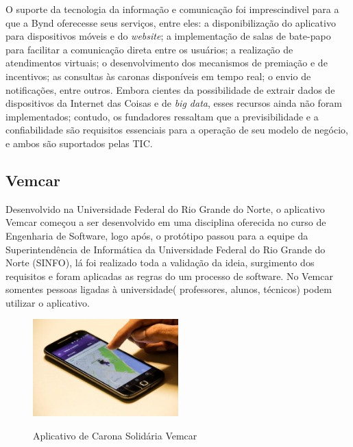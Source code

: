 
O suporte da tecnologia da informação e comunicação foi imprescindivel para a que a Bynd oferecesse seus serviços, entre eles: a disponibilização do aplicativo para dispositivos móveis e do \textit{website}; a implementação de salas de bate-papo para facilitar a comunicação direta entre os usuários; a realização de atendimentos virtuais; o desenvolvimento dos mecanismos de premiação e de incentivos; as consultas às caronas disponíveis em tempo real; o envio de notificações, entre outros. Embora cientes da possibilidade de extrair dados de dispositivos da Internet das Coisas e de \textit{big data}, esses recursos ainda não foram implementados; contudo, os fundadores ressaltam que a previsibilidade e a confiabilidade são requisitos essenciais para a operação de seu modelo de negócio, e ambos são suportados pelas TIC. 


\subsection{Vemcar}

Desenvolvido na Universidade Federal do Rio Grande do Norte, o aplicativo Vemcar começou a ser desenvolvido em uma disciplina oferecida no curso de Engenharia de Software, logo após, o protótipo passou para a equipe da Superintendência de Informática da Universidade Federal do Rio Grande do Norte (SINFO), lá foi realizado toda a validação da ideia, surgimento dos requisitos e foram aplicadas as regras do um processo de software. No Vemcar somentes pessoas ligadas à universidade( professores, alunos, técnicos) podem utilizar o aplicativo.


\begin{figure}[!hbtp]
	\centering
	\caption{Aplicativo de Carona Solidária Vemcar}
	\includegraphics[width=0.5\textwidth]{./04-figuras/vemcar.jpg}
	\label{fig:tecnologia}
\end{figure}



